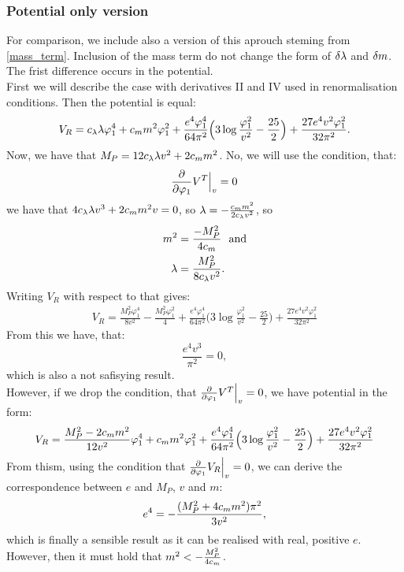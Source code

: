 \subsubsection{Potential only version}
For comparison, we include also a version of this aprouch steming from \ref{mass_term}.
Inclusion of the mass term do not change the
form of $\delta\lambda$ and $\delta m$. The frist difference occurs in the potential. \\
First we will describe the case with derivatives II and IV used in renormalisation conditions. 
Then the potential is equal:
\begin{align}
V_R = c_\lambda\lambda\varphi_1^4 + c_m m^2\varphi_1^2 +
\frac{e^4\varphi_1^4}{64\pi^2}\Big(3\log\frac{\varphi_1^2}{v^2}- 
\frac{25}{2}\Big)+
\frac{27e^4v^2\varphi_1^2}{32\pi^2}.
\end{align}
Now, we have that $M_P = 12c_\lambda\lambda v^2 + 2c_m m^2$. 
No, we will use the condition, that:
\begin{align}\label{tree_first}
\frac{\partial }{\partial \varphi_1}V^T\Big|_v = 0
\end{align}
we have that $4c_\lambda\lambda v^3+2c_m m^2v = 0$, so $\lambda = -\frac{c_m m^2}{2c_\lambda v^2}$, so 
\begin{align}
m^2&=\frac{-M_P^2}{4c_m} \textrm{\ \ and}\\ 
\lambda &= \frac{M_P^2}{8c_\lambda v^2}. 
\end{align}
Writing $V_R$ with respect to that gives:
\begin{align}
V_R = \frac{M_P^2\varphi_1^4}{8v^2}-\frac{M_P^2\varphi_1^2}{4} + 
\frac{e^4\varphi_1^4}{64\pi^2}\Big(3\log
\frac{\varphi_1^2}{v^2}- 
\frac{25}{2}\Big)+
\frac{27e^4v^2\varphi_1^2}{32\pi^2}
\end{align}
From this we have, that:
\begin{equation}
\frac{e^4v^3}{\pi^2} = 0,
\end{equation}
which is also a not safisying result. \\
However, if we drop the condition, that 
$\frac{\partial }{\partial \varphi_1}V^T\Big|_v = 0$, we have potential in the form:
\begin{align}
V_R = \frac{M_P^2-2c_m m^2}{12v^2}\varphi_1^4+c_m m^2\varphi_1^2 + 
\frac{e^4\varphi_1^4}{64\pi^2}\Big(3\log
\frac{\varphi_1^2}{v^2}- 
\frac{25}{2}\Big)+
\frac{27e^4v^2\varphi_1^2}{32\pi^2}
\end{align}
From thism, using the condition that $\frac{\partial }{\partial \varphi_1}V_R\Big|_v = 0$, we can derive the 
correspondence between $e$ and $M_P$, $v$ and $m$:
\begin{equation}
e^4 = -\frac{(M_P^2+4c_m m^2)\pi^2}{3v^2},
\end{equation}
which is finally a sensible result as it can be realised with real, positive $e$. However, then 
it must hold that $m^2<-\frac{M_P^2}{4c_m}$.
